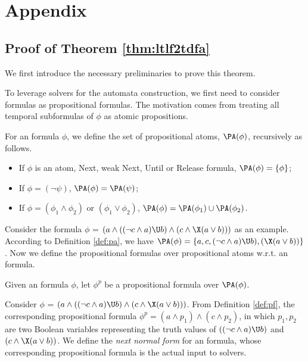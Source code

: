 \section{Appendix}
\subsection{Proof of Theorem \ref{thm:ltlf2tdfa}}

We first introduce the necessary preliminaries to prove this theorem. 

To leverage \SAT solvers for the automata construction, we first need to consider \ltlf formulas as propositional formulas. The motivation comes from treating all temporal subformulas of $\phi$ as atomic propositions. 

\begin{definition}\label{def:pa}
For an \ltlf formula $\phi$, we define the set of propositional atoms, $\PA(\phi)$, recursively as follows.
\begin{itemize}
	\item If $\phi$ is an atom, Next, weak Next, Until or Release formula, $\PA(\phi)=\{\phi\}$;
	\item If $\phi = (\neg \psi)$, $\PA(\phi)= \PA(\psi)$;
	\item If $\phi = (\phi_1 \wedge \phi_2)$ or $(\phi_1 \vee \phi_2)$, $\PA(\phi) = \PA(\phi_1) \cup \PA(\phi_2)$.
\end{itemize}
\end{definition}

Consider the formula $\phi$ = $(a \wedge ((\neg c \wedge a)\U b) \wedge (c \wedge \X (a \vee b)))$ as an example. According to Definition \ref{def:pa}, we have $\PA(\phi)=\{a, c, (\neg c \wedge a)\U b), (\X (a \vee b))\}$. Now we define the propositional formulas over propositional atoms w.r.t. an \ltlf formula.

\begin{definition}\label{def:pf}
Given an \ltlf formula $\phi$, let $\phi^{p}$ be a propositional formula over $\PA(\phi)$. 
\end{definition}

Consider $\phi$ = $(a \wedge ((\neg c \wedge a)\U b) \wedge (c \wedge \X (a \vee b)))$. From Definition \ref{def:pf}, the corresponding propositional formula $\phi^p = (a \wedge p_1) \wedge (c \wedge p_2)$, in which $p_1, p_2$ are two Boolean variables representing the truth values of $((\neg c \wedge a)\U b)$ and $(c \wedge \X (a \vee b))$. We define the \emph{next normal form} for an \ltlf formula, whose corresponding propositional formula is the actual input to \SAT solvers.


